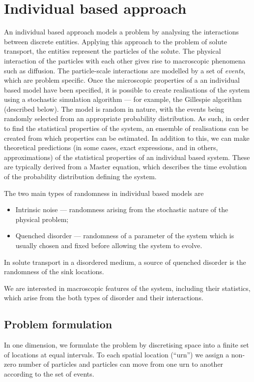 \chapter{Individual based approach}
An individual based approach models a problem by analysing the interactions
between discrete entities. Applying this approach to the problem of solute
transport, the entities represent the particles of the solute. The physical
interaction of the particles with each other gives rise to macroscopic phenomena
such as diffusion. The particle-scale interactions are modelled by a set of
\emph{events}, which are problem specific. Once the microscopic properties of a
an individual based model have been specified, it is possible to create
realisations of the system using a stochastic simulation algorithm --- for
example, the Gillespie algorithm (described below). The model
is random in nature, with the events being randomly selected from an appropriate
probability distribution. As such, in order to find the statistical properties
of the system, an ensemble of realisations can be created from which properties
can be estimated. In addition to this, we can make theoretical predictions (in
some cases, exact expressions, and in others, approximations) of the statistical
properties of an individual based system. These are typically derived from a
Master equation, which describes the time evolution of the probability
distribution defining the system.

The two main types of randomness in individual based models are
\begin{itemize}
    \item Intrinsic noise --- randomness arising from the stochastic nature of the
        physical problem;
    \item Quenched disorder --- randomness of a parameter of the system which is
        usually chosen and fixed before allowing the system to evolve.
\end{itemize}
In solute transport in a disordered medium, a source of quenched disorder is the
randomness of the sink locations.

We are interested in macroscopic features of the system, including their
statistics, which arise from the both types of disorder and their interactions.

\section{Problem formulation}
In one dimension, we formulate the problem by discretising space into a
finite set of locations at equal intervals. To each spatial location (``urn'') we assign
a non-zero number of particles and particles can move from one urn to
another according to the set of events.

